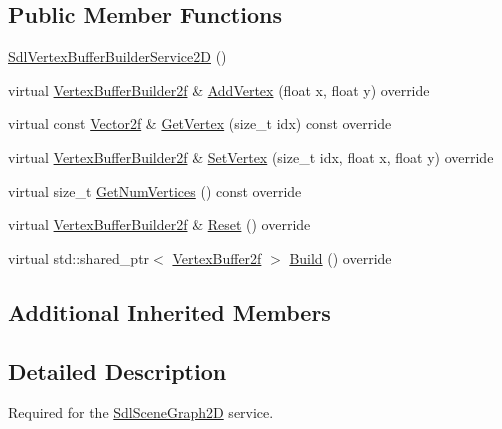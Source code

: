 \subsection*{Public Member Functions}
\begin{DoxyCompactItemize}
\item 
\hyperlink{classastu_1_1SdlVertexBufferBuilderService2D_aafa32a513119ff6d04e317e18b4ac3a3}{Sdl\+Vertex\+Buffer\+Builder\+Service2D} ()
\item 
virtual \hyperlink{group__gfx__group_ga45033e159deced790d4dc3968ad8e878}{Vertex\+Buffer\+Builder2f} \& \hyperlink{classastu_1_1SdlVertexBufferBuilderService2D_ad0d9a866c9225b95a7b5f7029598f99d}{Add\+Vertex} (float x, float y) override
\item 
virtual const \hyperlink{classastu_1_1Vector2}{Vector2f} \& \hyperlink{classastu_1_1SdlVertexBufferBuilderService2D_aaf43c4425363ccb8db57bb8963072a7f}{Get\+Vertex} (size\+\_\+t idx) const override
\item 
virtual \hyperlink{group__gfx__group_ga45033e159deced790d4dc3968ad8e878}{Vertex\+Buffer\+Builder2f} \& \hyperlink{classastu_1_1SdlVertexBufferBuilderService2D_a1263227c82ffd1ecd6cd53612d1d4b4b}{Set\+Vertex} (size\+\_\+t idx, float x, float y) override
\item 
virtual size\+\_\+t \hyperlink{classastu_1_1SdlVertexBufferBuilderService2D_a82b6c9eaeff1583edc3e42e6b1857b70}{Get\+Num\+Vertices} () const override
\item 
virtual \hyperlink{group__gfx__group_ga45033e159deced790d4dc3968ad8e878}{Vertex\+Buffer\+Builder2f} \& \hyperlink{classastu_1_1SdlVertexBufferBuilderService2D_a0a9bae699849ddf8ce74f591857e00d9}{Reset} () override
\item 
virtual std\+::shared\+\_\+ptr$<$ \hyperlink{group__gfx__group_ga081cf45a441eef100dfbb1e0f64c3826}{Vertex\+Buffer2f} $>$ \hyperlink{classastu_1_1SdlVertexBufferBuilderService2D_ad1825ce136ba0b4e8ef53fba3266f3af}{Build} () override
\end{DoxyCompactItemize}
\subsection*{Additional Inherited Members}


\subsection{Detailed Description}
Required for the \hyperlink{classastu_1_1SdlSceneGraph2D}{Sdl\+Scene\+Graph2D} service. 

